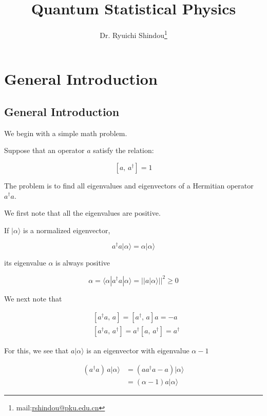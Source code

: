 ﻿\documentclass[twoside]{book}
\numberwithin{equation}{section}
\begin{document}
\title{Quantum Statistical Physics}
\author{Dr. Ryuichi Shindou\footnote{mail:\href{mailto:rshindou@pku.edu.cn}{rshindou@pku.edu.cn}}}
\maketitle


\tableofcontents




\chapter{General Introduction}

\section{General Introduction}


We begin with a simple math problem.

Suppose that an operator $a$ satisfy the relation:

\[\left[a,\,a^{\dagger}\right] = 1 \]

The problem is to find all eigenvalues and eigenvectors of a Hermitian operator $a^{\dagger}a$.

We first note that all the eigenvalues are positive.

If $|\alpha\rangle$ is a normalized eigenvector,

\[a^{\dagger}a|\alpha\rangle = \alpha|\alpha\rangle \]

its eigenvalue $\alpha$ is always positive

\[\alpha = \langle\alpha| a^{\dagger}a|\alpha\rangle = ||a|\alpha\rangle||^2 \ge 0 \]

We next note that

\[\begin{split}
&\left[a^{\dagger}a,\,a\right] = \left[a^{\dagger},\, a\right]a = -a \\
&\left[a^{\dagger}a,\,a^{\dagger}\right] = a^{\dagger}\left[a,\,a^{\dagger}\right] = a^{\dagger}
\end{split} \]

For this, we see that $a|\alpha\rangle$ is an eigenvector with eigenvalue $\alpha - 1$

\[\begin{split}
(a^{\dagger}a)\,a|\alpha\rangle &= \left(aa^{\dagger}a -a\right)|\alpha\rangle \\
&=(\alpha - 1)a|\alpha\rangle
\end{split}\]
\end{document}

